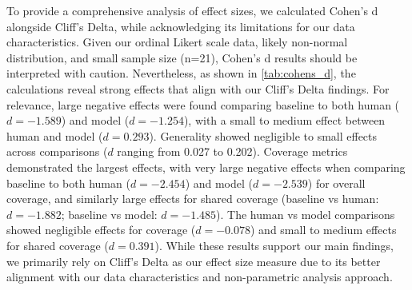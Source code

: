 To provide a comprehensive analysis of effect sizes, we calculated Cohen's d alongside Cliff's Delta, while acknowledging its limitations for our data characteristics. Given our ordinal Likert scale data, likely non-normal distribution, and small sample size (n=21), Cohen's d results should be interpreted with caution. Nevertheless, as shown in \cref{tab:cohens_d}, the calculations reveal strong effects that align with our Cliff's Delta findings. For relevance, large negative effects were found comparing baseline to both human ($d = -1.589$) and model ($d = -1.254$), with a small to medium effect between human and model ($d = 0.293$). Generality showed negligible to small effects across comparisons ($d$ ranging from 0.027 to 0.202). Coverage metrics demonstrated the largest effects, with very large negative effects when comparing baseline to both human ($d = -2.454$) and model ($d = -2.539$) for overall coverage, and similarly large effects for shared coverage (baseline vs human: $d = -1.882$; baseline vs model: $d = -1.485$). The human vs model comparisons showed negligible effects for coverage ($d = -0.078$) and small to medium effects for shared coverage ($d = 0.391$). While these results support our main findings, we primarily rely on Cliff's Delta as our effect size measure due to its better alignment with our data characteristics and non-parametric analysis approach.

